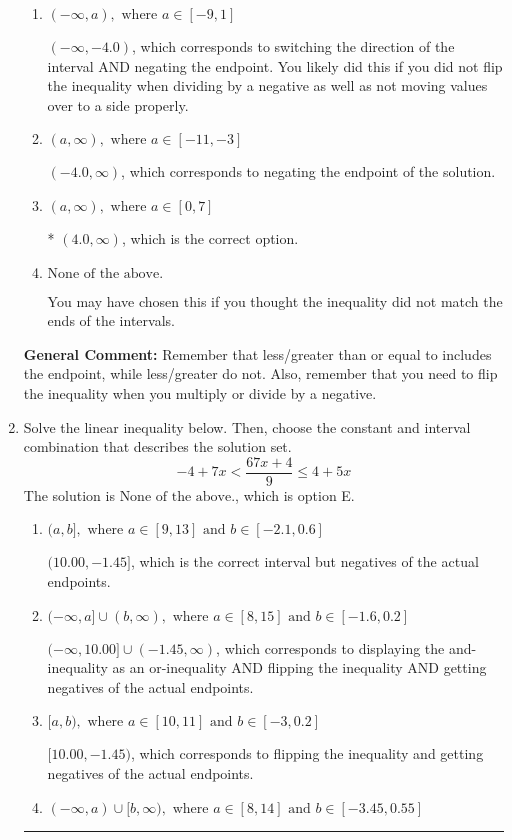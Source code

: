 \documentclass{extbook}[14pt]
\newcommand{\litem}[1]{\item #1

\rule{\textwidth}{0.4pt}}
\begin{document}
\begin{enumerate}
{\begin{enumerate}[label=\Alph*.]
 $(-\infty, 4.0)$, which corresponds to switching the direction of the interval. You likely did this if you did not flip the inequality when dividing by a negative!
\item \( (-\infty, a), \text{ where } a \in [-9, 1] \)

 $(-\infty, -4.0)$, which corresponds to switching the direction of the interval AND negating the endpoint. You likely did this if you did not flip the inequality when dividing by a negative as well as not moving values over to a side properly.
\item \( (a, \infty), \text{ where } a \in [-11, -3] \)

 $(-4.0, \infty)$, which corresponds to negating the endpoint of the solution.
\item \( (a, \infty), \text{ where } a \in [0, 7] \)

* $(4.0, \infty)$, which is the correct option.
\item \( \text{None of the above}. \)

You may have chosen this if you thought the inequality did not match the ends of the intervals.
\end{enumerate}

\textbf{General Comment:} Remember that less/greater than or equal to includes the endpoint, while less/greater do not. Also, remember that you need to flip the inequality when you multiply or divide by a negative.
}
\litem{
Solve the linear inequality below. Then, choose the constant and interval combination that describes the solution set.
\[ -4 + 7 x < \frac{67 x + 4}{9} \leq 4 + 5 x \]
The solution is \( \text{None of the above.} \), which is option E.\begin{enumerate}[label=\Alph*.]
\item \( (a, b], \text{ where } a \in [9, 13] \text{ and } b \in [-2.1, 0.6] \)

$(10.00, -1.45]$, which is the correct interval but negatives of the actual endpoints.
\item \( (-\infty, a] \cup (b, \infty), \text{ where } a \in [8, 15] \text{ and } b \in [-1.6, 0.2] \)

$(-\infty, 10.00] \cup (-1.45, \infty)$, which corresponds to displaying the and-inequality as an or-inequality AND flipping the inequality AND getting negatives of the actual endpoints.
\item \( [a, b), \text{ where } a \in [10, 11] \text{ and } b \in [-3, 0.2] \)

$[10.00, -1.45)$, which corresponds to flipping the inequality and getting negatives of the actual endpoints.
\item \( (-\infty, a) \cup [b, \infty), \text{ where } a \in [8, 14] \text{ and } b \in [-3.45, 0.55] \)


\end{enumerate}}
\end{enumerate}
\end{document}
